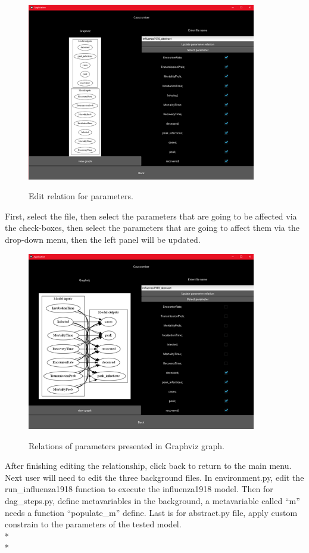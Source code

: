 \begin{figure}[H]
	\centering
	\includegraphics[width=10cm]{figures/influenzaTestProcess5.png}\\
	\caption{Edit relation for parameters.}
	\label{fig:figure23}
\end{figure}
\noindent 
First, select the file, then select the parameters that are going to be affected via the check-boxes, then select the parameters that are going to affect them via the drop-down menu, then the left panel will be updated.
\begin{figure}[H]
	\centering
	\includegraphics[width=10cm]{figures/influenzaTestProcess7.png}\\
	\caption{Relations of parameters presented in Graphviz graph.}
	\label{fig:figure25}
\end{figure}
\noindent 
After finishing editing the relationship, click back to return to the main menu.
Next user will need to edit the three background files. In environment.py, edit the run\_influenza1918 function to execute the influenza1918 model. Then for dag\_steps.py, define metavariables in the background, a metavariable called “m” needs a function “populate\_m” define. Last is for abstract.py file, apply custom constrain to the parameters of the tested model. \\*\\*
